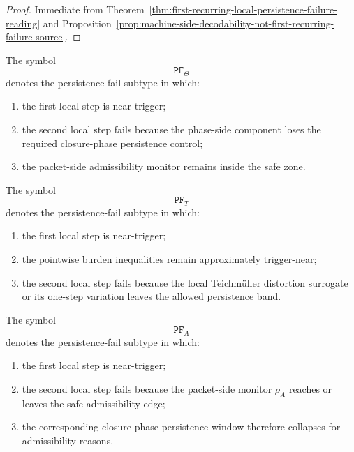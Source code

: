 \begin{proof}
Immediate from Theorem~\ref{thm:first-recurring-local-persistence-failure-reading} and Proposition~\ref{prop:machine-side-decodability-not-first-recurring-failure-source}.
\end{proof}


\begin{definition}
\label{def:theta-drift-persistence-fail-subtype}
The symbol
\[
\mathtt{PF}_{\Theta}
\]
denotes the persistence-fail subtype in which:
\begin{enumerate}
 \item the first local step is near-trigger;
 \item the second local step fails because the phase-side component loses the required closure-phase persistence control;
 \item the packet-side admissibility monitor remains inside the safe zone.
\end{enumerate}
\end{definition}

\begin{definition}
\label{def:teichmueller-distortion-persistence-fail-subtype}
The symbol
\[
\mathtt{PF}_{T}
\]
denotes the persistence-fail subtype in which:
\begin{enumerate}
 \item the first local step is near-trigger;
 \item the pointwise burden inequalities remain approximately trigger-near;
 \item the second local step fails because the local Teichm\"uller distortion surrogate or its one-step variation leaves the allowed persistence band.
\end{enumerate}
\end{definition}

\begin{definition}
\label{def:admissibility-edge-persistence-fail-subtype}
The symbol
\[
\mathtt{PF}_{A}
\]
denotes the persistence-fail subtype in which:
\begin{enumerate}
 \item the first local step is near-trigger;
 \item the second local step fails because the packet-side monitor \(\rho_A\) reaches or leaves the safe admissibility edge;
 \item the corresponding closure-phase persistence window therefore collapses for admissibility reasons.
\end{enumerate}
\end{definition}

